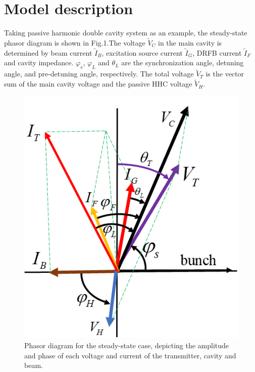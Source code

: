 \documentclass[letterpaper,
               nospread,     %
               ]{jacow}
\begin{document}
\section{Model description}
Taking passive harmonic double cavity system as an example, the steady-state phasor diagram is shown in Fig.1.The voltage ${{\tilde{V}}_{C}}$ in the main cavity is determined by beam current ${{\tilde{I}}_{B}}$, excitation source current $\tilde{I}_{G}^{{}}$, DRFB current $\tilde{I}_{F}^{{}}$ and cavity impedance. ${{\varphi }_{s}}$, ${{\varphi }_{L}}$ and ${{\theta }_{L}}$ are the synchronization angle, detuning angle, and pre-detuning angle, respectively. The total voltage ${{\tilde{V}}_{T}}$ is the vector sum of the main cavity voltage and the passive HHC voltage ${{\tilde{V}}_{H}}$.
\begin{figure}[!htb]
   \centering
   \includegraphics*[width=.5\columnwidth]{THPA037_f1}
   \caption{Phasor diagram for the steady-state case, depicting the amplitude and phase of each voltage and current of the transmitter, cavity and beam.}
   \label{fig:paper_layout}
\end{figure}
\end{document}
